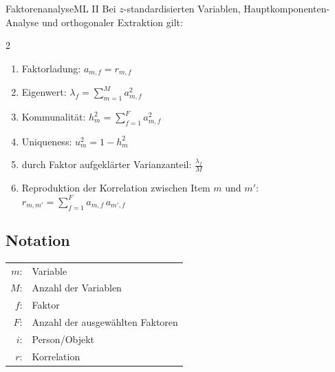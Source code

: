 
\begin{formulaBox}{Faktorenanalyse}{ML II}
Bei $z$-standardisierten Variablen, Hauptkomponenten-Analyse und orthogonaler Extraktion gilt:
\begin{multicols}{2}
\begin{enumerate}
  \item Faktorladung: $a_{m,f}=r_{m,f}$
    \item Eigenwert: $\lambda_f=\sum\limits_{m=1}^M a_{m,f}^2$
    \item Kommunalität: $h_m^2=\sum\limits_{f=1}^F a_{m,f}^2$
    \item Uniqueness: $u_m^2=1-h_m^2$
    \item durch Faktor aufgeklärter Varianzanteil: $\frac{\lambda_f}{M}$
    \item Reproduktion der Korrelation zwischen Item $m$ und $m'$: \\$r_{m,m'}=\sum\limits_{f=1}^F a_{m,f}\,a_{m',f}$
\end{enumerate}

\columnbreak

\subsection*{Notation}
\begin{tabular}{rl}
$m$: &Variable \\
$M$: &Anzahl der Variablen\\
$f$: &Faktor \\
$F$: &Anzahl der ausgewählten Faktoren\\
$i$: &Person/Objekt \\ 
$r$: &Korrelation\\
\end{tabular}
\end{multicols}
\end{formulaBox}
